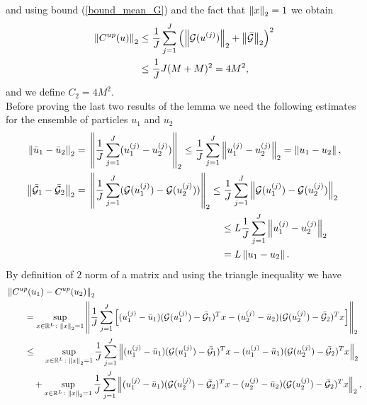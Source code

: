 and using bound (\ref{bound_mean_G}) and the fact that $\left\|x\right\|_2 = 1$ we obtain
\begin{align*}
\left\|C^{up}(u)\right\|_2 \le & \; \frac{1}{J} \sum_{j=1}^J \left ( \left\|\mathcal{G}(u^{(j)})\right\|_2 + \left\|\bar{\mathcal{G}}\right\|_2 \right )^2 \\
\le & \; \frac{1}{J} J (M + M)^2 = 4M^2,
\end{align*}
and we define $C_2 = 4M^2$. \\
Before proving the last two results of the lemma we need the following estimates for the ensemble of particles $u_1$ and $u_2$
\begin{align*}
\norm{\bar{u}_1 - \bar{u}_2}_2 = & \; \left \lVert \frac{1}{J} \sum_{j=1}^J (u_1^{(j)} - u_2^{(j)}) \right \rVert_2 \le \frac{1}{J} \sum_{j=1}^J \norm{u_1^{(j)} - u_2^{(j)}}_2 = \norm{u_1 - u_2}, \\
\norm{\bar{\mathcal{G}}_1 - \bar{\mathcal{G}}_2}_2 = & \; \left \lVert \frac{1}{J} \sum_{j=1}^J (\mathcal{G}(u_1^{(j)}) - \mathcal{G}(u_2^{(j)})) \right \rVert_2 \le \frac{1}{J} \sum_{j=1}^J \norm{\mathcal{G}(u_1^{(j)}) - \mathcal{G}(u_2^{(j)})}_2 \\
& \hspace{137pt} \le L \frac{1}{J} \sum_{j=1}^J \norm{u_1^{(j)} - u_2^{(j)}}_2 \\
& \hspace{137pt} = L \norm{u_1 - u_2}.
\end{align*}
By definition of $2$ norm of a matrix and using the triangle inequality we have
\begin{align*}
& \left\|C^{up}(u_1) - C^{up}(u_2)\right\|_2 \\
& \qquad = \sup_{x \in \mathbb{R}^L \colon \left\|x\right\|_2 = 1} \left \lVert \frac{1}{J} \sum_{j=1}^J \left [ (u_1^{(j)} - \bar{u}_1) (\mathcal{G}(u_1^{(j)}) - \bar{\mathcal{G}}_1)^T x - (u_2^{(j)} - \bar{u}_2) (\mathcal{G}(u_2^{(j)}) - \bar{\mathcal{G}}_2)^T x \right ] \right \rVert_2 \\
& \qquad \le \quad \sup_{x \in \mathbb{R}^L \colon \left\|x\right\|_2 = 1} \frac{1}{J} \sum_{j=1}^J \left \lVert (u_1^{(j)} - \bar{u}_1) (\mathcal{G}(u_1^{(j)}) - \bar{\mathcal{G}}_1)^T x - (u_1^{(j)} - \bar{u}_1) (\mathcal{G}(u_2^{(j)}) - \bar{\mathcal{G}}_2)^T x \right \rVert_2 \\
& \qquad \quad + \sup_{x \in \mathbb{R}^L \colon \left\|x\right\|_2 = 1} \frac{1}{J} \sum_{j=1}^J \left \lVert (u_1^{(j)} - \bar{u}_1) (\mathcal{G}(u_2^{(j)}) - \bar{\mathcal{G}}_2)^T x - (u_2^{(j)} - \bar{u}_2) (\mathcal{G}(u_2^{(j)}) - \bar{\mathcal{G}}_2)^T x \right \rVert_2,
\end{align*}
